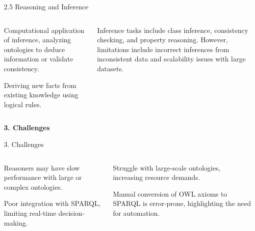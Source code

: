 \begin{frame}{2.5 Reasoning and Inference}
    \begin{columns}
        \begin{column}{6cm}
            \begin{bee}[Reasoning]
                Computational application of inference, analyzing ontologies to deduce information or validate consistency. 
            \end{bee}
            \begin{bee}[Inference]
                Deriving new facts from existing knowledge using logical rules.  
            \end{bee}
        \end{column}

        \begin{column}{6cm}
            \begin{bee}[]
                Inference tasks include class inference, consistency checking, and property reasoning. However, limitations include incorrect inferences from inconsistent data and scalability issues with large datasets.
            \end{bee}
        \end{column}
    \end{columns}
\end{frame}

\begin{frame}[plain]
    \begingroup
        \selectfont
        \Huge\color{black}\textbf{3. Challenges}\\[0.6em]
    \endgroup
\end{frame}

\begin{frame}{3. Challenges}
    \begin{columns}
        \begin{column}{5cm}
            \begin{bee}[Efficiency]
                Reasoners may have slow performance with large or complex ontologies.
            \end{bee}
            
            \begin{bee}[SPARQL]
                Poor integration with SPARQL, limiting real-time decision-making. 
            \end{bee}
            
        \end{column}
        
        \begin{column}{5cm}
            \begin{bee}[Scalability]
                Struggle with large-scale ontologies, increasing resource demands. 
            \end{bee}
            
            \begin{bee}[Automation]
                Manual conversion of OWL axioms to SPARQL is error-prone, highlighting the need for automation.
            \end{bee}
        \end{column}
    \end{columns}
\end{frame}

